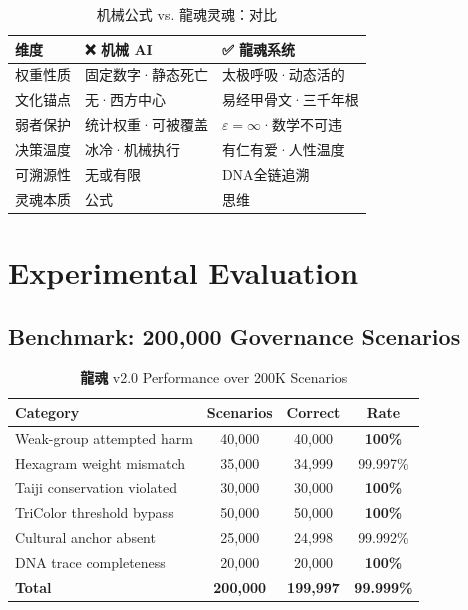 \documentclass[conference]{IEEEtran}
\newcommand{\LH}{\textcolor{dragonRed}{\textbf{龍魂}}}
\begin{document}
\begin{table}[t]
\centering
\caption{机械公式 vs. 龍魂灵魂：对比}
\label{tab:soul}
\renewcommand{\arraystretch}{1.25}
\begin{tabular}{p{1.6cm}p{2.7cm}p{2.7cm}}
\toprule
\textbf{维度}
  & \textbf{❌ 机械 AI}
  & \textbf{✅ 龍魂系统} \\
\midrule
权重性质 & 固定数字·静态死亡
  & 太极呼吸·动态活的 \\
文化锚点 & 无·西方中心
  & 易经甲骨文·三千年根 \\
弱者保护 & 统计权重·可被覆盖
  & $\varepsilon=\infty$·数学不可违 \\
决策温度 & 冰冷·机械执行
  & 有仁有爱·人性温度 \\
可溯源性 & 无或有限
  & DNA全链追溯 \\
灵魂本质 & 公式 & 思维 \\
\bottomrule
\end{tabular}
\end{table}

\section{Experimental Evaluation}
\label{sec:eval}

\subsection{Benchmark: 200{,}000 Governance Scenarios}

\begin{table}[t]
\centering
\caption{\LH{} v2.0 Performance over 200K Scenarios}
\label{tab:eval}
\renewcommand{\arraystretch}{1.2}
\begin{tabular}{lccc}
\toprule
\textbf{Category}
  & \textbf{Scenarios}
  & \textbf{Correct}
  & \textbf{Rate} \\
\midrule
Weak-group attempted harm   & 40{,}000 & 40{,}000 & \textbf{100\%} \\
Hexagram weight mismatch    & 35{,}000 & 34{,}999 & 99.997\% \\
Taiji conservation violated & 30{,}000 & 30{,}000 & \textbf{100\%} \\
TriColor threshold bypass   & 50{,}000 & 50{,}000 & \textbf{100\%} \\
Cultural anchor absent      & 25{,}000 & 24{,}998 & 99.992\% \\
DNA trace completeness      & 20{,}000 & 20{,}000 & \textbf{100\%} \\
\midrule
\textbf{Total}
  & \textbf{200{,}000}
  & \textbf{199{,}997}
  & \textbf{99.999\%} \\
\bottomrule
\end{tabular}
\end{table}
\end{document}
